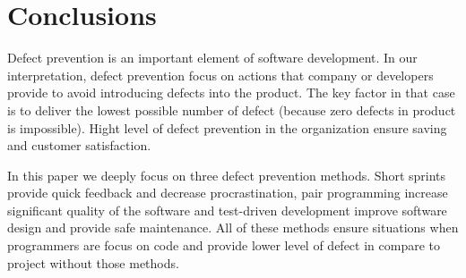 \section{Conclusions}

Defect prevention is an important element of software development. In our interpretation, defect prevention focus on actions that company or developers provide to avoid introducing defects into the product. The key factor in that case is to deliver the lowest possible number of defect (because zero defects in product is impossible). Hight level of defect prevention in the organization ensure saving and customer satisfaction. 

In this paper we deeply focus on three defect prevention methods. Short sprints provide quick feedback and decrease procrastination, pair programming increase significant quality of the software and test-driven development improve software design and provide safe maintenance. All of these methods ensure situations when programmers are focus on code and provide lower level of defect in compare to project without those methods. 